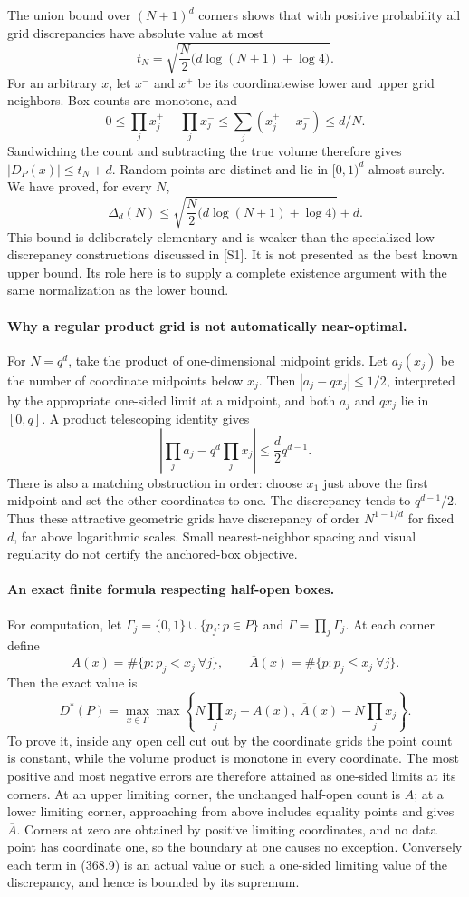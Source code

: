 \documentclass[11pt]{article}
\begin{document}
The union bound over $(N+1)^d$ corners shows that with positive
probability all grid discrepancies have absolute value at most
\[
 t_N=\sqrt{\frac N2\bigl(d\log(N+1)+\log4\bigr)}.
 \tag{368.6}
\]
For an arbitrary $x$, let $x^-$ and $x^+$ be its coordinatewise
lower and upper grid neighbors. Box counts are monotone, and
\[
 0\leq\prod_jx_j^+-\prod_jx_j^-\leq\sum_j(x_j^+-x_j^-)\leq d/N.
\]
Sandwiching the count and subtracting the true volume therefore
gives $|D_P(x)|\leq t_N+d$. Random points are distinct and lie
in $[0,1)^d$ almost surely. We have proved, for every $N$,
\[
 \Delta_d(N)\leq
 \sqrt{\frac N2\bigl(d\log(N+1)+\log4\bigr)}+d.
 \tag{368.7}
\]
This bound is deliberately elementary and is weaker than the
specialized low-discrepancy constructions discussed in [S1]. It
is not presented as the best known upper bound. Its role here is
to supply a complete existence argument with the same normalization
as the lower bound.

\paragraph{Why a regular product grid is not automatically near-optimal.}
For $N=q^d$, take the product of one-dimensional midpoint grids.
Let $a_j(x_j)$ be the number of coordinate midpoints below $x_j$.
Then $|a_j-qx_j|\leq1/2$, interpreted by the appropriate one-sided
limit at a midpoint, and both $a_j$ and $qx_j$ lie in $[0,q]$.
A product telescoping identity gives
\[
 \left|\prod_ja_j-q^d\prod_jx_j\right|
      \leq\frac d2 q^{d-1}.
 \tag{368.8}
\]
There is also a matching obstruction in order: choose $x_1$ just
above the first midpoint and set the other coordinates to one.
The discrepancy tends to $q^{d-1}/2$. Thus these attractive
geometric grids have discrepancy of order $N^{1-1/d}$ for fixed
$d$, far above logarithmic scales. Small nearest-neighbor spacing
and visual regularity do not certify the anchored-box objective.

\paragraph{An exact finite formula respecting half-open boxes.}
For computation, let
$\Gamma_j=\{0,1\}\cup\{p_j:p\in P\}$ and
$\Gamma=\prod_j\Gamma_j$. At each corner define
\[
 A(x)=\#\{p:p_j<x_j\ \forall j\},\qquad
 \overline A(x)=\#\{p:p_j\leq x_j\ \forall j\}.
\]
Then the exact value is
\[
 D^*(P)=\max_{x\in\Gamma}
 \max\left\{N\prod_jx_j-A(x),\
                   \overline A(x)-N\prod_jx_j\right\}.
 \tag{368.9}
\]
To prove it, inside any open cell cut out by the coordinate grids
the point count is constant, while the volume product is monotone
in every coordinate. The most positive and most negative errors
are therefore attained as one-sided limits at its corners. At an
upper limiting corner, the unchanged half-open count is $A$; at a
lower limiting corner, approaching from above includes equality
points and gives $\overline A$. Corners at zero are obtained by
positive limiting coordinates, and no data point has coordinate
one, so the boundary at one causes no exception. Conversely each
term in (368.9) is an actual value or such a one-sided limiting
value of the discrepancy, and hence is bounded by its supremum.
\end{document}
